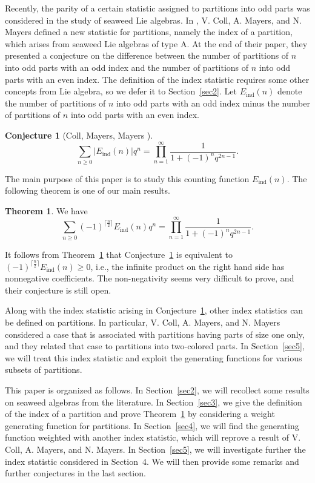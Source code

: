 \documentclass[reqno]{amsart}
\theoremstyle{definition}
\newtheorem{thm}{Theorem}%
\newtheorem{cnj}{Conjecture}%
\newcommand{\ind}{\mathrm{ind}}
\begin{document}
Recently, the parity of a certain statistic assigned to partitions into odd parts was considered in the study of seaweed Lie algebras. In \cite{collmayersmayers}, V. Coll, A. Mayers, and N. Mayers defined a new statistic for partitions, namely  the index of a partition, which arises from seaweed Lie algebras of type A. At the end of their paper, they presented a conjecture on the difference between the number of partitions of $n$ into odd parts with an odd index and the number of partitions of $n$ into odd parts with an even index. The definition of the index statistic requires some other concepts from Lie algebra, so we defer it to  Section~\ref{sec2}.  Let $E_{\ind}(n)$ denote the number of partitions of $n$ into odd parts with an odd index minus the number of partitions of $n$ into odd parts with an even index. 

\begin{cnj}[Coll, Mayers, Mayers \cite{collmayersmayers}] \label{conj1}
$$\sum_{n\ge 0} |E_{\ind}(n)| q^n=\prod_{n=1}^{\infty} \frac{1}{1+(-1)^n q^{2n-1}}. $$ 
\end{cnj}

The main purpose of this paper is to study this counting function $E_{\ind}(n)$.  The following theorem is one of our main results.
\begin{thm} \label{thm1}
We have
$$
\sum_{n\ge 0}(-1)^{ \lceil \frac{n}{2} \rceil }E_{\ind}(n) q^n =\prod_{n=1}^{\infty} \frac{1}{1+(-1)^n q^{2n-1}}.
$$
\end{thm}

It follows from Theorem~\ref{thm1} that Conjecture~\ref{conj1} is equivalent to $(-1)^{ \lceil \frac{n}{2} \rceil }E_{\ind}(n)\ge 0$, i.e., the infinite product on the right hand side has nonnegative coefficients.  The non-negativity seems very difficult to prove, and their conjecture is still open.

Along with the index statistic arising in Conjecture~\ref{conj1}, other index statistics can be defined on partitions. In particular, V. Coll, A. Mayers, and N. Mayers considered a case that is associated with partitions having parts of size one only, and they related that case to partitions into two-colored parts. In Section~\ref{sec5}, we will treat this index statistic and exploit the generating functions for various subsets of partitions.

This paper is organized as follows. In Section~\ref{sec2}, we will recollect some results on seaweed algebras from the literature. In Section~\ref{sec3}, we give the definition of the index of a partition and prove Theorem~\ref{thm1} by considering a weight generating function for partitions.  In Section~\ref{sec4}, we will find the generating function weighted with another index statistic, which will reprove a result of V. Coll, A. Mayers, and N. Mayers. In Section~\ref{sec5}, we will investigate further the index statistic considered in Section~4. We will  then provide some remarks and further conjectures in the last section.
\end{document}
